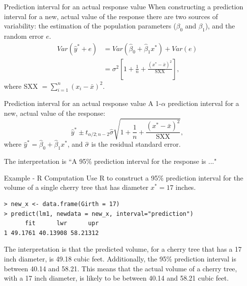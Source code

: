 \documentclass[10pt]{beamer}
\begin{document}
\begin{frame}{Prediction interval for an actual response value}
When constructing a prediction interval for a new, actual value of the response there are two sources of variability: the estimation of the population parameters ($\beta_0$ and $\beta_1$), and the random error $e$. 
\begin{align*}
Var(\hat{y}^* + e) &= Var(\hat{\beta}_0 + \hat{\beta}_1 x^*) + Var(e)\\
&= \sigma^2 \left[ 1 + \frac{1}{n} + \frac{(x^* - \bar{x})^2}{\text{SXX}} \right],
\end{align*}
where SXX $= \sum_{i=1}^n (x_i - \bar{x})^2$.\\
\end{frame}

\begin{frame}{Prediction interval for an actual response value}
A 1-$\alpha$ prediction interval for a new, actual value of the response:
$$\hat{y}^* \pm t_{\alpha/2; n-2} \hat{\sigma} \sqrt{1 + \frac{1}{n} + \frac{(x^* - \bar{x})^2}{\text{SXX}}},$$
where $\hat{y}^* = \hat{\beta}_0 + \hat{\beta}_1 x^*$, and $\hat{\sigma}$ is the residual standard error.\\
\vspace{15pt}

The interpretation is ``A 95\% prediction interval for the response is ..."
\end{frame}

\begin{frame}[fragile]{Example - R Computation}
Use R to construct a 95\% prediction interval for the volume of a single cherry tree that has diameter $x^* = 17$ inches.

\begin{verbatim}
> new_x <- data.frame(Girth = 17)
> predict(lm1, newdata = new_x, interval="prediction")
      fit      lwr      upr
1 49.1761 40.13908 58.21312
\end{verbatim}

The interpretation is that the predicted volume, for a cherry tree that has a 17 inch diameter, is 49.18 cubic feet.  Additionally, the 95\% prediction interval is between 40.14 and 58.21.  This means that the actual volume of a cherry tree, with a 17 inch diameter, is likely to be between 40.14 and 58.21 cubic feet.    
\end{frame}
\end{document}
